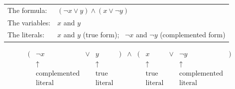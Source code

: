 \begin{tabular}{ll}
{\small\sf The formula}:  & $(\neg {x} \vee y) \wedge (x \vee \neg{y})$ \\
{\small\sf The variables}: & $x$ and $y$ \\
{\small\sf The literals}:  & $x$ and $y$ (true form); \ $\neg {x}$ and $\neg {y}$
(complemented form)
\end{tabular}
\[
\begin{array}{ccccccccccc}
( & \neg {x} & \vee & y & ) & \wedge & ( & x & \vee & \neg{y} & ) \\
  & \uparrow &     & \uparrow & & & & \uparrow & & \uparrow & \\
  & \mbox{complemented} &  & \mbox{true}  & & & & \mbox{true} &
        & \mbox{complemented} &  \\
  & \mbox{literal} & & \mbox{literal} & & & & \mbox{literal} & &
  \mbox{literal} & 
\end{array}
\]

\smallskip

